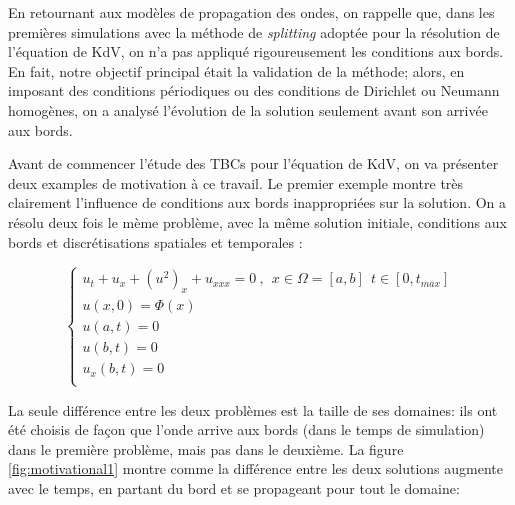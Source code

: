 \indent En retournant aux modèles de propagation des ondes, on rappelle que, dans les premières simulations avec la méthode de \emph{splitting} adoptée pour la résolution de l'équation de KdV, on n'a pas appliqué rigoureusement les conditions aux bords. En fait, notre objectif principal était la validation de la méthode; alors, en imposant des conditions périodiques ou des conditions de Dirichlet ou Neumann homogènes, on a analysé l'évolution de la solution seulement avant son arrivée aux bords.

\indent Avant de commencer l'étude des TBCs pour l'équation de KdV, on va présenter deux examples de motivation à ce travail. Le premier exemple montre très clairement l'influence de conditions aux bords inappropriées sur la solution. On a résolu deux fois le mème problème, avec la même solution initiale, conditions aux bords et discrétisations spatiales et temporales :

\begin{equation*}
    \begin{cases}
    u_t + u_x + (u^2)_x + u_{xxx} = 0 \ , \ \ x \in \Omega=[a,b] \ \ t \in [0, t_{max}] \\
    u(x,0) = \Phi(x) \\
    u(a,t) = 0 \\
    u(b,t) = 0 \\
    u_x(b,t) = 0  \\ 
    \end{cases}
\end{equation*}

\indent La seule différence entre les deux problèmes est la taille de ses domaines: ils ont été choisis de façon que l'onde arrive aux bords (dans le temps de simulation) dans le première problème, mais pas dans le deuxième. La figure \ref{fig:motivational1} montre comme la différence entre les deux solutions augmente avec le temps, en partant du bord et se propageant pour tout le domaine:

\indent

